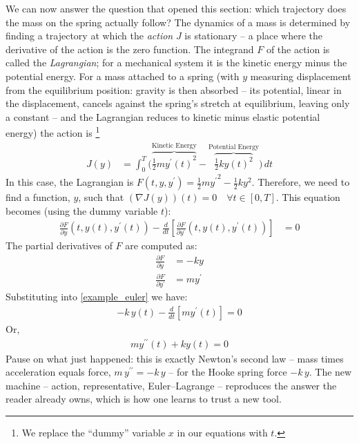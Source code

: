 \documentclass{article}
\begin{document}
We can now answer the question that opened this section: which trajectory
does the mass on the spring actually follow?
The dynamics of a mass is determined by finding a trajectory at which the
{\em action\/} $J$ is stationary -- a place where the derivative of the
action is the zero function. The integrand $F$ of the action is called the
{\em Lagrangian\/}; for a mechanical system it is the kinetic energy minus
the potential energy.
For a mass attached to a spring (with $y$ measuring displacement from the
equilibrium position: gravity is then absorbed -- its potential, linear in
the displacement, cancels against the spring's stretch at equilibrium,
leaving only a constant -- and the Lagrangian reduces to kinetic minus
elastic potential energy)
the action is%
\footnote{We replace the ``dummy''{} variable $x$ in our equations with $t$.}
\begin{align}
  J(y) &= \int_0^T \biggl( \overbrace{\frac{1}{2} m {y^\prime(t)}^2}^{\text{Kinetic Energy}} 
                    - \overbrace{\frac{1}{2}  k y(t)^2}^{\text{Potential Energy}} \biggr) \, dt
\end{align}
In this case, the Lagrangian is
$F(t, y, y^\prime) = \frac{1}{2} m {y^\prime}^2 - \frac{1}{2} k y^2 $.
Therefore, we need to find a function, $y$, such that $(\nabla J(y))(t) = 0 \quad \forall t \in[0,T]$. This
equation becomes (using the dummy variable $t$):
\begin{align}
  \frac{\partial F}{\partial y}(t, y(t), y^\prime(t))
  - \frac{d}{dt} \left[ \frac{\partial F}{\partial y^\prime}(t, y(t), y^\prime(t))\right] &= 0 \label{example_euler}
\end{align}
The partial derivatives of $F$ are computed as:
\begin{align}
  \frac{\partial F}{\partial y} &= -k y \\
  \frac{\partial F}{\partial y^\prime} &= my^\prime
\end{align}
Substituting into \eqref{example_euler} we have:
\begin{align}
  -k\, y(t) - \frac{d}{dt} \left[ m y^\prime(t) \right] = 0
\end{align}
Or,
\begin{align}
  m y^{\prime\prime}(t) + k y(t) = 0
\end{align}
Pause on what just happened: this is exactly Newton's second law -- mass
times acceleration equals force, $m\, y^{\prime\prime} = -k\, y$ -- for the
Hooke spring force $-k\,y$. The new machine -- action,
representative, Euler--Lagrange -- reproduces the answer the reader
already owns, which is how one learns to trust a new tool.
\end{document}
